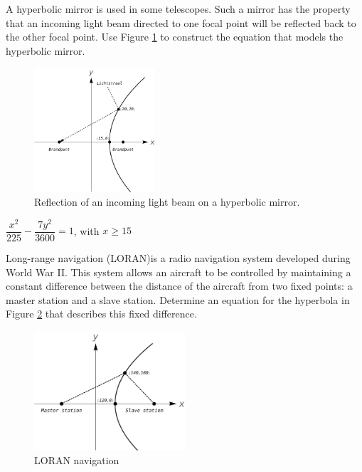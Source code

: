 \begin{Exercise}[difficulty=2] A hyperbolic mirror is used in some telescopes. Such a mirror has the property that an incoming light beam directed to one focal point will be reflected back to the other focal point. Use Figure \ref{fig_algebraic_38} to construct the equation that models the hyperbolic mirror. %
    	\begin{figure}[h]
    	\begin{center}
    		\includegraphics[width=0.4\textwidth]{fig_algebraic_38}
    		\caption{Reflection of an incoming light beam on a hyperbolic mirror.}
    		\label{fig_algebraic_38}
    	\end{center}
    	\end{figure}

\end{Exercise}

\begin{Answer}\phantom{}
    $\dfrac{x^2}{225} - \dfrac{7y^2}{3600} = 1$, with $x \geq 15$
\end{Answer}

\begin{Exercise}[difficulty=2] Long-range navigation (LORAN)is a radio navigation system developed during World War II. This system allows an aircraft to be controlled by maintaining a constant difference between the distance of the aircraft from two fixed points: a master station and a slave station. Determine an equation for the hyperbola in Figure \ref{fig_algebraic_39} that describes this fixed difference.
    	\begin{figure}[ht]
    	\begin{center}
    		\includegraphics[width=0.5\textwidth]{fig_algebraic_39}
    		\caption{LORAN navigation}
    		\label{fig_algebraic_39}
    	\end{center}
    	\end{figure}

\end{Exercise}


